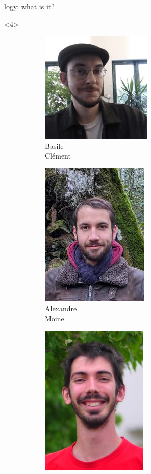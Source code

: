 \begin{frame}{\Zoo[]logy: what is it?}

\begin{overbox}<4>
    \begin{figure}
        \begin{subfigure}{0.4\textwidth}
            \includegraphics[scale=0.4]{images/basile_clement.jpg}
            \caption*{\footnotesize Basile \\ Clément}
        \end{subfigure}
        \begin{subfigure}{0.3\textwidth}
            \includegraphics[scale=0.3]{images/alexandre_moine.jpg}
            \caption*{\footnotesize Alexandre \\ Moine}
        \end{subfigure}
        \begin{subfigure}{0.25\textwidth}
            \includegraphics[scale=1.2]{images/gabriel_scherer.jpg}

\end{subfigure}
\end{figure}
\end{overbox}
\end{frame}
